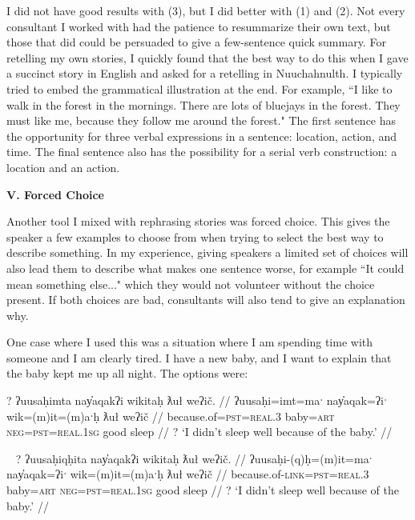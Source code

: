 I did not have good results with (3), but I did better with (1) and (2). Not every consultant I worked with had the patience to resummarize their own text, but those that did could be persuaded to give a few-sentence quick summary. For retelling my own stories, I quickly found that the best way to do this when I gave a succinct story in English and asked for a retelling in Nuuchahnulth. I typically tried to embed the grammatical illustration at the end. For example, ``I like to walk in the forest in the mornings. There are lots of bluejays in the forest. They must like me, because they follow me around the forest." The first sentence has the opportunity for three verbal expressions in a sentence: location, action, and time. The final sentence also has the possibility for a serial verb construction: a location and an action.

\vspace{8pt}

\noindent \textbf{V. Forced Choice}

Another tool I mixed with rephrasing stories was forced choice. This gives the speaker a few examples to choose from when trying to select the best way to describe something. In my experience, giving speakers a limited set of choices will also lead them to describe what makes one sentence worse, for example ``It could mean something else..." which they would not volunteer without the choice present. If both choices are bad, consultants will also tend to give an explanation why.

One case where I used this was a situation where I am spending time with someone and I am clearly tired. I have a new baby, and I want to explain that the baby kept me up all night. The options were:

\ex \label{becauseofbaby1}
\begingl
\glpreamble ? ʔuusaḥimta nay̓aqakʔi wikitaḥ ƛuł weʔič. //
\gla ʔuusaḥi=imt=maˑ nay̓aqak=ʔiˑ wik=(m)it=(m)aˑḥ ƛuł weʔič //
\glb because.of=\textsc{pst}=\textsc{real.3} baby=\textsc{art} \textsc{neg}=\textsc{pst}=\textsc{real.1sg} good sleep //
\glft ? `I didn't sleep well because of the baby.' //
\endgl
\xe

\ex~ \label{becauseofbaby2}
\begingl
\glpreamble ? ʔuusaḥiqḥita nay̓aqakʔi wikitaḥ ƛuł weʔič. //
\gla ʔuusaḥi-(q)ḥ=(m)it=maˑ nay̓aqak=ʔiˑ wik=(m)it=(m)aˑḥ ƛuł weʔič //
\glb because.of-\textsc{link}=\textsc{pst}=\textsc{real.3} baby=\textsc{art} \textsc{neg}=\textsc{pst}=\textsc{real.1sg} good sleep //
\glft ? `I didn't sleep well because of the baby.' //
\endgl
\xe

